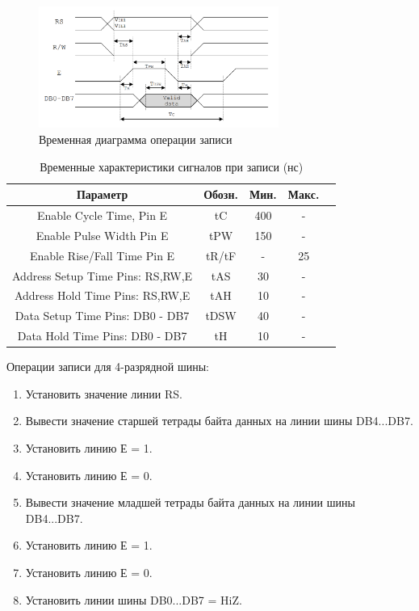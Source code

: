 \documentclass[a4paper,oneside ,10pt]{extreport}
\begin{document}
\begin{figure}[!ht]
	\centering
	\includegraphics[width=0.7\textwidth]{image/LCD_WR_2.PNG}
	\caption{Временная диаграмма операции записи}
	\label{full_adder}
\end{figure}

\begin{table}[!ht]
	\begin{center}
		\begin{tabular}{c c c c c}
			\hline\hline
			Параметр 							& Обозн. 	& Мин. 	& Макс. \\
			\hline
			Enable Cycle Time, Pin E 			& tC		& 400 	& 	- 	\\
			Enable Pulse Width Pin E 			& tPW 		& 150 	& 	- 	\\
			Enable Rise/Fall Time Pin E 		& tR/tF 	& - 	& 	25	\\
			Address Setup Time Pins: RS,RW,E 	& tAS 		& 30 	& 	-	\\
			Address Hold Time Pins: RS,RW,E 	& tAH 		& 10 	& 	-	\\
			Data Setup Time Pins: DB0 - DB7 	& tDSW 		& 40 	& 	-	\\
			Data Hold Time Pins: DB0 - DB7  	& tH 		& 10 	& 	-	\\
			\hline
		\end{tabular}
		\caption{Временные характеристики сигналов при записи (нс)}
		\label{LCD_TO_FPGA_WR_TABLE}
	\end{center}
\end{table}

Операции записи для 4-разрядной шины:
\begin{enumerate}
	\item Установить значение линии RS.
	\item Вывести значение старшей тетрады байта данных на линии шины DB4...DB7.
	\item Установить линию Е = 1.
	\item Установить линию Е = 0.
	\item Вывести значение младшей тетрады байта данных на линии шины DB4...DB7.
	\item Установить линию Е = 1.
	\item Установить линию Е = 0.
	\item Установить линии шины DB0...DB7 = HiZ.
\end{enumerate}
\end{document}
